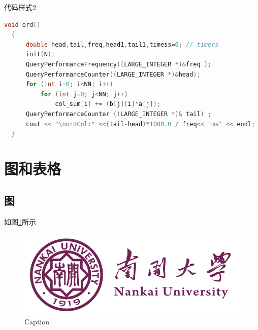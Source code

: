 \documentclass[a4paper]{article}
\begin{document}
代码样式2
\begin{lstlisting}[title=逐列访问平凡算法,frame=trbl,language={C++}]
  void ord()   
  {
      double head,tail,freq,head1,tail1,timess=0; // timers
      init(N);
      QueryPerformanceFrequency((LARGE_INTEGER *)&freq );
      QueryPerformanceCounter((LARGE_INTEGER *)&head);
      for (int i=0; i<NN; i++)
          for (int j=0; j<NN; j++)
              col_sum[i] += (b[j][i]*a[j]);
      QueryPerformanceCounter ((LARGE_INTEGER *)& tail) ;
      cout << "\nordCol:" <<(tail-head)*1000.0 / freq<< "ms" << endl;
  }
\end{lstlisting}

\section{图和表格}
\subsection{图}
如图\ref{fig:1}所示
\begin{figure}[H]
  \centering
  \includegraphics[scale=0.3]{NKU.png}
  \caption{Caption}
  \label{fig:1}
\end{figure}
\end{document}
